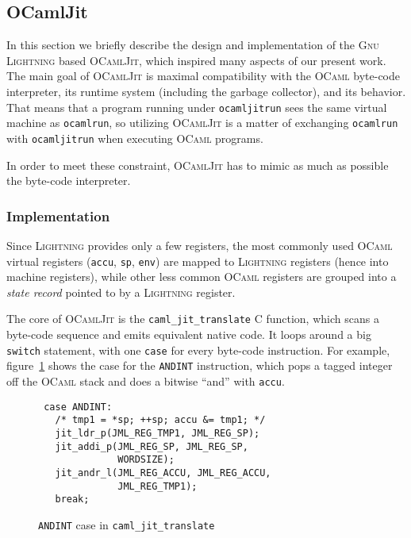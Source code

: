 \documentclass[10pt,a4paper,twocolumn]{article}
\begin{document}
\subsection{OCamlJit} \label{subsection:OCamlJit}

In this section we briefly describe the design and implementation of the \textsc{Gnu Lightning}\cite{Bonzini10}
based \textsc{OCamlJit}\cite{Starynkevitch04},
which inspired many aspects of our present work. The main goal of \textsc{OCamlJit} is maximal compatibility
with the \textsc{OCaml} byte-code interpreter, its runtime system (including the garbage collector), and its
behavior. That means that a program running under \texttt{ocamljitrun} sees the same virtual machine as
\texttt{ocamlrun}, so utilizing \textsc{OCamlJit} is a matter of exchanging \texttt{ocamlrun} with
\texttt{ocamljitrun} when executing \textsc{OCaml} programs.

In order to meet these constraint, \textsc{OCamlJit} has to mimic as much as possible the byte-code
interpreter.

\subsubsection{Implementation}

Since \textsc{Lightning} provides only a few registers, the most commonly used \textsc{OCaml} virtual
registers (\texttt{accu}, \texttt{sp}, \texttt{env}) are mapped to \textsc{Lightning} registers (hence
into machine registers), while other less common \textsc{OCaml} registers are grouped into a \emph{state
record} pointed to by a \textsc{Lightning} register.

The core of \textsc{OCamlJit} is the \texttt{caml\_jit\_translate} C function, which scans a byte-code
sequence and emits equivalent native code. It loops around a big \texttt{switch} statement, with one
\texttt{case} for every byte-code instruction. For example, figure~\ref{figure:caml_jit_translate_andint} shows
the case for the \texttt{ANDINT} instruction, which pops a tagged integer off the \textsc{OCaml} stack
and does a bitwise ``and'' with \texttt{accu}.

\begin{figure}[ht]
  \centering
  \begin{verbatim}
 case ANDINT:
   /* tmp1 = *sp; ++sp; accu &= tmp1; */
   jit_ldr_p(JML_REG_TMP1, JML_REG_SP);
   jit_addi_p(JML_REG_SP, JML_REG_SP,
              WORDSIZE);
   jit_andr_l(JML_REG_ACCU, JML_REG_ACCU,
              JML_REG_TMP1);
   break;
\end{verbatim}
  \caption{\texttt{ANDINT} case in \texttt{caml\_jit\_translate}}
  \label{figure:caml_jit_translate_andint}
\end{figure}
\end{document}
